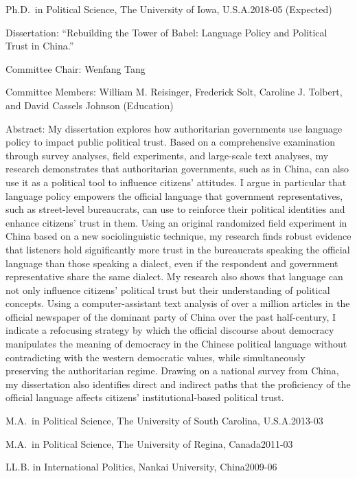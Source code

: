 \documentclass[10.5pt,]{article}
\providecommand{\tightlist}{%
	\setlength{\itemsep}{0pt}\setlength{\parskip}{0pt}}
\renewenvironment{itemize}{
	\begin{list}{}{
			\setlength{\leftmargin}{1.5em}
		}
	}{
	\end{list}
}
\begin{document}
\begin{itemize}
\tightlist
\item
  Ph.D.~in Political Science, The University of Iowa,
  U.S.A.\hfill 2018-05 (Expected)

  \begin{itemize}
  \tightlist
  \item
    \footnotesize Dissertation: ``Rebuilding the Tower of Babel:
    Language Policy and Political Trust in China.''

    \begin{itemize}
    \tightlist
    \item
      Committee Chair: Wenfang Tang
    \item
      Committee Members: William M. Reisinger, Frederick Solt, Caroline
      J. Tolbert, and David Cassels Johnson (Education)
    \item
      Abstract: My dissertation explores how authoritarian governments
      use language policy to impact public political trust. Based on a
      comprehensive examination through survey analyses, field
      experiments, and large-scale text analyses, my research
      demonstrates that authoritarian governments, such as in China, can
      also use it as a political tool to influence citizens' attitudes.
      I argue in particular that language policy empowers the official
      language that government representatives, such as street-level
      bureaucrats, can use to reinforce their political identities and
      enhance citizens' trust in them. Using an original randomized
      field experiment in China based on a new sociolinguistic
      technique, my research finds robust evidence that listeners hold
      significantly more trust in the bureaucrats speaking the official
      language than those speaking a dialect, even if the respondent and
      government representative share the same dialect. My research also
      shows that language can not only influence citizens' political
      trust but their understanding of political concepts. Using a
      computer-assistant text analysis of over a million articles in the
      official newspaper of the dominant party of China over the past
      half-century, I indicate a refocusing strategy by which the
      official discourse about democracy manipulates the meaning of
      democracy in the Chinese political language without contradicting
      with the western democratic values, while simultaneously
      preserving the authoritarian regime. Drawing on a national survey
      from China, my dissertation also identifies direct and indirect
      paths that the proficiency of the official language affects
      citizens' institutional-based political trust.
    \end{itemize}
  \end{itemize}
\item
  M.A.~in Political Science, The University of South Carolina,
  U.S.A.\hfill 2013-03
\item
  M.A.~in Political Science, The University of Regina,
  Canada\hfill 2011-03
\item
  LL.B. in International Politics, Nankai University,
  China\hfill 2009-06
\end{itemize}
\end{document}
